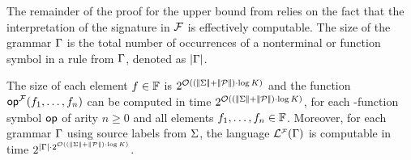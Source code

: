 The remainder of the proof for the upper bound from
 relies on the fact that the interpretation of
the \hrtext{} signature in $\mathcal{F}$ is effectively computable. The
size of the grammar $\Gamma$ is the total number of occurrences of a
nonterminal or function symbol in a rule from $\Gamma$, denoted as
$|{\Gamma}|$.

\newcommand{\closedstp}[3]{\mathsf{closed}^{#1}_{#2}({#3})}

\begin{propositionE}[][category=proofs]\label{prop:alg-flows}
  The size of each element $f \in \mathbb{F}$ is
  $2^{\mathcal{O}((|\!|{\Sigma}|\!|+|\!|{\mathcal{P}}|\!|) \cdot \log K)}$
  and the function $\mathsf{op}^{\mathcal{F}}(f_1,\ldots,f_n)$ can be computed in
  time $2^{\mathcal{O}((|\!|{\Sigma}|\!|+|\!|{\mathcal{P}}|\!|) \cdot \log
    K)}$, for each \hrtext-function symbol $\mathsf{op}$ of arity $n\geq0$
  and all elements $f_1,\ldots,f_n \in \mathbb{F}$. Moreover, for
  each grammar $\Gamma$ using source labels from $\Sigma$,
  the language $\mathcal{L}_{}^{\scriptscriptstyle{\mathcal{F}}}({\Gamma})$ is computable in time
  $2^{|{\Gamma}| \cdot
    2^{\mathcal{O}((|\!|{\Sigma}|\!|+|\!|{\mathcal{P}}|\!|) \cdot \log
      K)}}$.
\end{propositionE}
